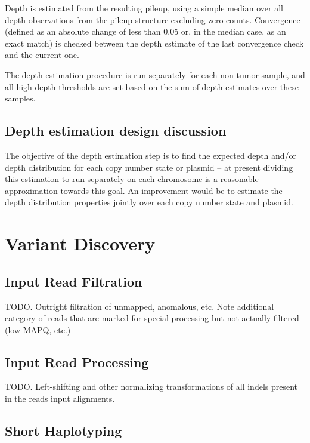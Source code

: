 \documentclass{article}
\begin{document}
Depth is estimated from the resulting pileup, using a simple median over all depth observations from the pileup structure excluding zero counts. Convergence (defined as an absolute change of less than 0.05 or, in the median case, as an exact match) is checked between the depth estimate of the last convergence check and the current one.

The depth estimation procedure is run separately for each non-tumor sample, and all high-depth thresholds are set based on the sum of depth estimates over these samples.


\subsection{Depth estimation design discussion}

The objective of the depth estimation step is to find the expected depth and/or depth distribution for each copy number state or plasmid -- at present dividing this estimation to run separately on each chromosome is a reasonable approximation towards this goal. An improvement would be to estimate the depth distribution properties jointly over each copy number state and plasmid.



\section{Variant Discovery}


\subsection{Input Read Filtration}

TODO. Outright filtration of unmapped, anomalous, etc. Note additional category of reads that are marked for special processing but not actually filtered (low MAPQ, etc.)


\subsection{Input Read Processing}

TODO. Left-shifting and other normalizing transformations of all indels present in the reads input alignments.


\subsection{Short Haplotyping}
\end{document}

